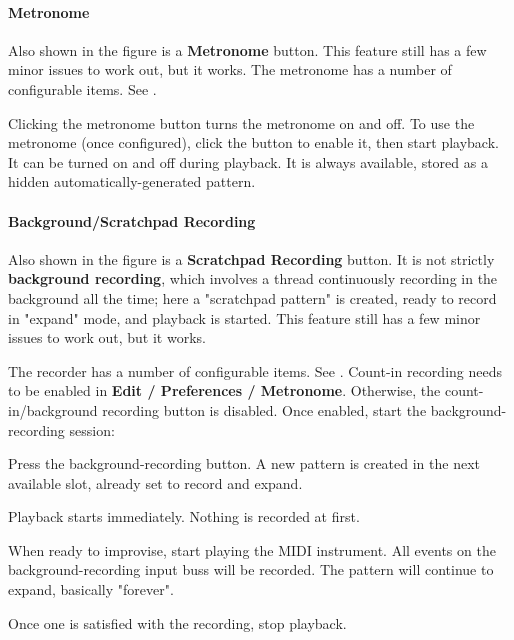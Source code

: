 \paragraph{Metronome}
\label{paragraph:patterns_metronome}

   Also shown in the figure is a \textbf{Metronome} button.
   This feature still has a few minor issues to work out, but it works.
   The metronome has a number of configurable items.
   See .

   Clicking the metronome button turns the metronome on and off.
   To use the metronome (once configured), click the button to enable it,
   then start playback.
   It can be turned on and off during playback.
   It is always available, stored as a hidden automatically-generated
   pattern.

\paragraph{Background/Scratchpad Recording}
\label{paragraph:patterns_background_recording}

   Also shown in the figure is a \textbf{Scratchpad Recording} button.
   It is not strictly \textbf{background recording}, which involves a
   thread continuously recording in the background all the time;
   here a "scratchpad pattern" is created, ready to record in "expand"
   mode, and playback is started.
   This feature still has a few
   minor issues to work out, but it works.

   The recorder has a number of configurable items.
   See .
   Count-in recording needs to be enabled in
   \textbf{Edit / Preferences / Metronome}.
   Otherwise, the count-in/background recording button is disabled.
   Once enabled, start the background-recording session:

   \begin{enumber}
      \item Press the background-recording button.
         A new pattern is created in the next available slot, already
         set to record and expand.
      \item Playback starts immediately.
         Nothing is recorded at first.
      \item When ready to improvise, start playing the MIDI instrument.
         All events on the background-recording input buss will be recorded.
         The pattern will continue to expand, basically "forever".
      \item Once one is satisfied with the recording, stop playback.
      \end{enumber}

